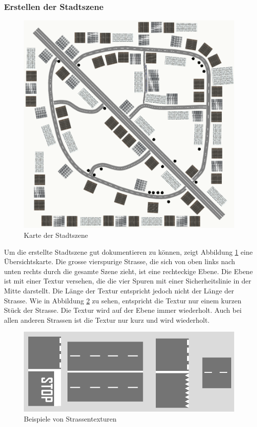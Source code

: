 \subsubsection{Erstellen der Stadtszene}
\begin{figure}[H]
\centering 
\includegraphics[width=1\linewidth]{src/CityWorld_map.png}
\caption{Karte der Stadtszene} %
\label{CityWorld_map} %
\end{figure}
Um die erstellte Stadtszene gut dokumentieren zu können, zeigt Abbildung \ref{CityWorld_map} eine Übersichtskarte. Die grosse vierspurige Strasse, die sich von oben links nach unten rechts durch die gesamte Szene zieht, ist eine rechteckige Ebene. Die Ebene ist mit einer Textur versehen, die die vier Spuren mit einer Sicherheitslinie in der Mitte darstellt. Die Länge der Textur entspricht jedoch nicht der Länge der Strasse. Wie in Abbildung \ref{examples_street_textures} zu sehen, entspricht die Textur nur einem kurzen Stück der Strasse. Die Textur wird auf der Ebene immer wiederholt. Auch bei allen anderen Strassen ist die Textur nur kurz und wird wiederholt.\\
\begin{figure}[H]
\centering 
\includegraphics[scale=0.6]{src/examples_street_textures.png}
\caption{Beispiele von Strassentexturen} %
\label{examples_street_textures} %
\end{figure}

